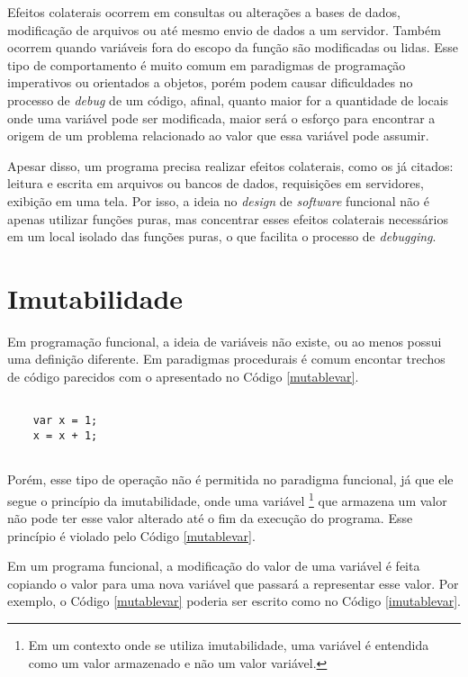 Efeitos colaterais ocorrem em consultas ou 
alterações a bases de dados, modificação de 
arquivos ou até mesmo envio de dados a um 
servidor\cite{purefunctionscala, functionalscala}. 
Também ocorrem quando variáveis fora 
do escopo da função são modificadas ou lidas. 
Esse tipo de comportamento é muito comum em 
paradigmas de programação imperativos ou 
orientados a objetos, porém 
podem causar dificuldades no processo de 
\textit{debug} de um código, afinal, 
quanto maior for a quantidade de locais onde 
uma variável pode ser modificada, maior 
será o esforço para encontrar a origem de 
um problema relacionado ao valor que essa 
variável pode assumir.

Apesar disso, um programa precisa realizar 
efeitos colaterais, como os já citados: 
leitura e escrita em arquivos ou bancos de 
dados, requisições em servidores, exibição em 
uma tela. Por isso, a ideia no \textit{design} de 
\textit{software} funcional não é apenas utilizar 
funções puras, mas concentrar esses efeitos 
colaterais necessários em um local isolado das 
funções puras, o que facilita o 
processo de \textit{debugging}\cite{purefunctionscala}.



\section{Imutabilidade}

Em programação funcional, a ideia de variáveis não 
existe, ou ao menos possui uma definição diferente\cite{braveclojure}.
Em paradigmas procedurais é comum encontar trechos 
de código parecidos com o apresentado no Código \ref{mutablevar}.

\begin{lstlisting}[caption={Exemplo de Código Mutável. Fonte: O Autor (2021)},label=mutablevar]

    var x = 1;
    x = x + 1;


\end{lstlisting}

Porém, esse tipo de operação não é permitida no 
paradigma funcional, já que ele segue o princípio 
da imutabilidade, onde uma variável \footnote{
Em um contexto onde se utiliza imutabilidade, uma 
variável é entendida como um valor armazenado 
e não um valor variável.} que armazena um valor 
não pode ter esse valor alterado até o fim da 
execução do programa. Esse princípio é violado  
pelo Código \ref{mutablevar}.

Em um programa funcional, a modificação do valor 
de uma variável é feita copiando o valor para uma 
nova variável que passará a representar esse valor\cite{functionalscala}.
Por exemplo, o Código \ref{mutablevar} poderia ser 
escrito como no Código \ref{imutablevar}.

